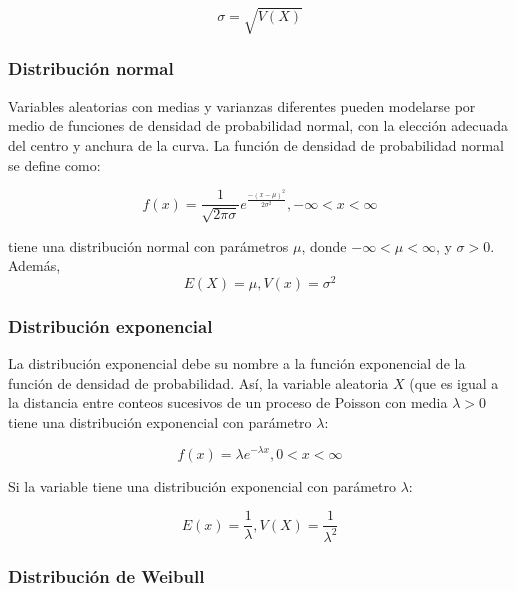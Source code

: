 \begin{equation}
\sigma=\sqrt{V(X)}
\end{equation}

\subsubsection{Distribución normal}

Variables aleatorias con medias y varianzas diferentes pueden modelarse por medio de funciones de densidad de probabilidad normal, con la elección adecuada del centro y anchura de la curva. La función de densidad de probabilidad normal se define como:

\begin{equation}
f(x)=\frac{1}{\sqrt{2\pi\sigma}}e^{\frac{-(x-\mu)^2}{2\sigma^2}}  ,  -\infty<x<\infty
\end{equation}

tiene una distribución normal con parámetros $\mu$, donde $-\infty<\mu<\infty$, y $\sigma>0$.\\

Además,
\begin{equation}
E(X)=\mu , V(x)=\sigma^2
\end{equation}

\subsubsection{Distribución exponencial}

La distribución exponencial debe su nombre a la función exponencial de la función de densidad de probabilidad. Así, la variable aleatoria $X$ (que es igual a la distancia entre conteos sucesivos de un proceso de Poisson con media $\lambda>0$ tiene una distribución exponencial con parámetro $\lambda$:

\begin{equation}
f(x)=\lambda e^{-\lambda x}, 0<x<\infty
\end{equation}

Si la variable tiene una distribución exponencial con parámetro $\lambda$:

\begin{equation}
E(x)=\frac{1}{\lambda}, V(X)=\frac{1}{\lambda^2}
\end{equation}

\subsubsection{Distribución de Weibull}

